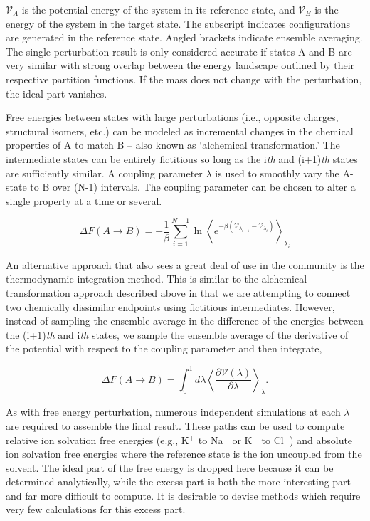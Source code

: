 \begin{theory}
 \noindent $\mathcal{V}_{A}$ is the potential energy of the system in its reference state, and $\mathcal{V}_{B}$ is the energy
 of the system in the target state. The subscript indicates configurations are generated in the reference state. Angled brackets 
 indicate ensemble averaging. The single-perturbation result is only considered accurate if states A and B are very similar with
 strong overlap between the energy landscape outlined by their respective partition functions. If the mass does not change with 
 the perturbation, the ideal part vanishes. 
 
 Free energies between states with large perturbations (i.e., opposite charges, structural isomers, etc.) can be modeled as 
 incremental changes in the chemical properties of A to match B -- also known as `alchemical transformation.' The intermediate 
 states can be entirely fictitious so long as the i\emph{th} and (i+1)\emph{th} states are sufficiently similar. A coupling 
 parameter $\lambda$ is used to smoothly vary the A-state to B over (N-1) intervals. The coupling parameter can be chosen to 
 alter a single property at a time or several.
 
  \begin{equation}\label{alchemical}
     \Delta F(A\rightarrow B) = -\frac{1}{\beta} \sum_{i=1}^{N-1} \ln\left<e^{-\beta\left(\mathcal{V}_{\lambda_{i+1}}-\mathcal{V}_{\lambda_{i}}\right)}\right>_{\lambda_{i}}
 \end{equation}
 
 An alternative approach that also sees a great deal of use in the community is the thermodynamic integration method. This is 
 similar to the alchemical transformation approach described above in that we are attempting to connect two chemically 
 dissimilar endpoints using fictitious intermediates. However, instead of sampling the ensemble average in the difference of
 the energies between the (i+1)\emph{th} and i\emph{th} states, we sample the ensemble average of the derivative of the 
 potential with respect to the coupling parameter and then integrate,
 
 \begin{equation}\label{ti}
     \Delta F(A\rightarrow B) = \int_{0}^{1} d\lambda \left< \frac{\partial \mathcal{V}(\lambda)}{\partial \lambda}\right>_{\lambda}.
 \end{equation}
 
 As with free energy perturbation, numerous independent simulations at each $\lambda$ are required to assemble the final result. 
 These paths can be used to compute relative ion solvation free energies (e.g., K$^{+}$ to Na$^{+}$ or K$^{+}$ to Cl$^{-}$) and 
 absolute ion solvation free energies where the reference state is the ion uncoupled from the solvent. The ideal part of the free 
 energy is dropped here because it can be determined analytically, while the excess part is both the more interesting part and 
 far more difficult to compute. It is desirable to devise methods which require very few calculations for this excess part.
 

\end{theory}
